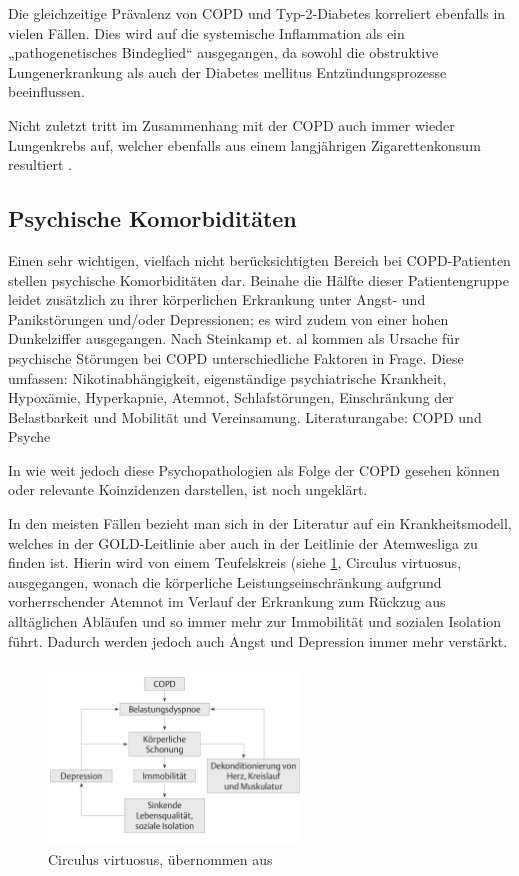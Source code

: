 Die gleichzeitige Prävalenz von COPD und Typ-2-Diabetes korreliert ebenfalls in vielen Fällen. Dies wird auf die systemische Inflammation als ein „pathogenetisches Bindeglied“ ausgegangen, da sowohl die obstruktive Lungenerkrankung als auch der Diabetes mellitus Entzündungsprozesse beeinflussen.

Nicht zuletzt tritt im Zusammenhang mit der COPD auch immer wieder Lungenkrebs auf, welcher ebenfalls aus einem langjährigen Zigarettenkonsum resultiert \autocite[vgl.][38]{stiefelhagen2013}.


\subsection{Psychische Komorbiditäten}
\label{psychische_komorbiditaet}
Einen sehr wichtigen, vielfach nicht berücksichtigten Bereich bei COPD-Patienten stellen psychische Komorbiditäten dar.  Beinahe die Hälfte dieser Patientengruppe leidet zusätzlich zu ihrer körperlichen Erkrankung unter Angst- und Panikstörungen und/oder Depressionen; es wird zudem von einer hohen Dunkelziffer ausgegangen. Nach Steinkamp et. al kommen als Ursache für psychische Störungen bei COPD unterschiedliche Faktoren in Frage. Diese umfassen: Nikotinabhängigkeit, eigenständige psychiatrische Krankheit, Hypoxämie, Hyperkapnie, Atemnot, Schlafstörungen, Einschränkung der Belastbarkeit und Mobilität und Vereinsamung. Literaturangabe: COPD und Psyche 
 
In wie weit jedoch diese Psychopathologien als Folge der COPD gesehen können oder relevante Koinzidenzen darstellen, ist noch ungeklärt. 

In den meisten Fällen bezieht man sich in der Literatur auf ein Krankheitsmodell, welches in der GOLD-Leitlinie aber auch in der Leitlinie der Atemwesliga zu finden ist. Hierin wird von einem Teufelskreis (siehe \ref{fig:copd_teufelskreis}, Circulus virtuosus, ausgegangen, wonach die körperliche Leistungseinschränkung aufgrund vorherrschender Atemnot im Verlauf der Erkrankung zum Rückzug aus alltäglichen Abläufen und so immer mehr zur Immobilität und sozialen Isolation führt. 
Dadurch werden jedoch auch Angst und Depression immer mehr verstärkt. 

\begin{figure}
 \centering
  \includegraphics[width=0.6\textwidth]{teufelskreis}
  \caption{Circulus virtuosus, übernommen aus \cite[e19]{vogelmeier2007}}
  \label{fig:copd_teufelskreis}
\end{figure}

